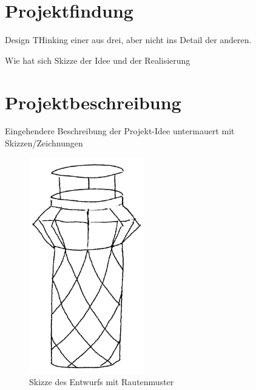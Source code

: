 \chapter{Projektfindung}

    Design THinking einer aus drei, aber nicht ins Detail der anderen.
    
    Wie hat sich Skizze der Idee und der Realisierung

\chapter{Projektbeschreibung}
    
    Eingehendere Beschreibung der Projekt-Idee untermauert mit
    Skizzen/Zeichnungen

    \begin{figure}[h]
        \begin{center}
            \includegraphics[width=5cm]{sketches/bin.png}
        \end{center}
        \caption{Skizze des Entwurfs mit Rautenmuster}
        \label{fig:bin_1}
    \end{figure}
